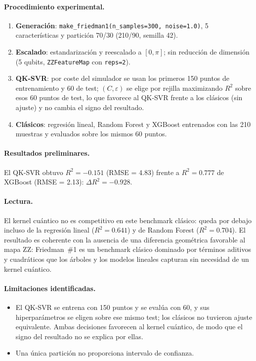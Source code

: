 \paragraph{Procedimiento experimental.}
\begin{enumerate}
  \item \textbf{Generación}: \texttt{make\_friedman1(n\_samples=300, noise=1.0)}, 5 características y partición 70/30 (210/90, semilla 42).
  \item \textbf{Escalado}: estandarización y reescalado a $[0,\pi]$; sin reducción de dimensión (5 qubits, \texttt{ZZFeatureMap} con \texttt{reps=2}).
  \item \textbf{QK-SVR}: por coste del simulador se usan los primeros 150 puntos de entrenamiento y 60 de test; $(C,\varepsilon)$ se elige por rejilla maximizando $R^2$ sobre esos 60 puntos de test, lo que favorece al QK-SVR frente a los clásicos (sin ajuste) y no cambia el signo del resultado.
  \item \textbf{Clásicos}: regresión lineal, Random Forest y XGBoost entrenados con las 210 muestras y evaluados sobre los mismos 60 puntos.
\end{enumerate}

\paragraph{Resultados preliminares.}
El QK-SVR obtuvo $R^2 = -0.151$ (RMSE = 4.83) frente a $R^2 = 0.777$ de XGBoost (RMSE = 2.13): $\Delta R^2 = -0.928$.

\paragraph{Lectura.}
El kernel cuántico no es competitivo en este benchmark clásico: queda por debajo incluso de la regresión lineal ($R^2=0.641$) y de Random Forest ($R^2=0.704$). El resultado es coherente con la ausencia de una diferencia geométrica favorable al mapa ZZ: Friedman~\#1 es un benchmark clásico dominado por términos aditivos y cuadráticos que los árboles y los modelos lineales capturan sin necesidad de un kernel cuántico.

\paragraph{Limitaciones identificadas.}
\begin{itemize}
  \item El QK-SVR se entrena con 150 puntos y se evalúa con 60, y sus hiperparámetros se eligen sobre ese mismo test; los clásicos no tuvieron ajuste equivalente. Ambas decisiones favorecen al kernel cuántico, de modo que el signo del resultado no se explica por ellas.
  \item Una única partición no proporciona intervalo de confianza.
\end{itemize}

